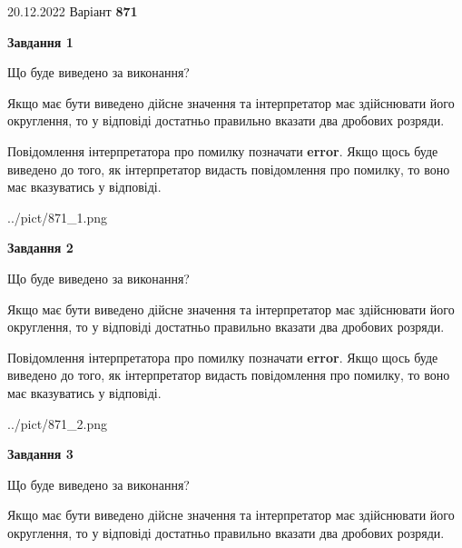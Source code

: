 \documentclass[12pt, ukrainian]{article}
\begin{document}
{20.12.2022 Варіант \No \textbf { 871 }\par}
{
\begin {Large}

{\begin {center}\textbf{Завдання 1}\end {center}}\par
Що буде виведено за виконання? \par

Якщо має бути виведено дійсне значення та інтерпретатор має здійснювати його округлення, 
то у відповіді достатньо правильно вказати два дробових розряди.

Повідомлення інтерпретатора про помилку позначати \textbf{error}.
Якщо щось буде виведено до того, як інтерпретатор видасть повідомлення про помилку, 
то воно має вказуватись у відповіді. \par

\begin{center}
	{../pict/871_1.png}
\end{center}
\newpage

{\begin {center}\textbf{Завдання 2}\end {center}}\par
Що буде виведено за виконання? \par

Якщо має бути виведено дійсне значення та інтерпретатор має здійснювати його округлення, 
то у відповіді достатньо правильно вказати два дробових розряди.

Повідомлення інтерпретатора про помилку позначати \textbf{error}.
Якщо щось буде виведено до того, як інтерпретатор видасть повідомлення про помилку, 
то воно має вказуватись у відповіді. \par

\begin{center}
	{../pict/871_2.png}
\end{center}
\newpage

{\begin {center}\textbf{Завдання 3}\end {center}}\par
Що буде виведено за виконання? \par

Якщо має бути виведено дійсне значення та інтерпретатор має здійснювати його округлення, 
то у відповіді достатньо правильно вказати два дробових розряди.


\end{Large}}
\end{document}
